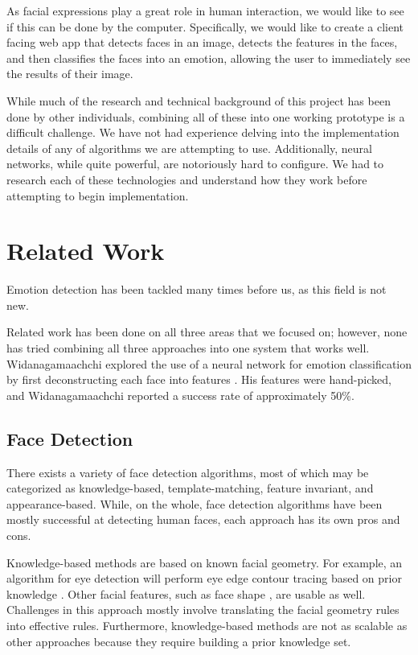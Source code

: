 \documentclass[10pt,twocolumn,letterpaper]{article}
\begin{document}
As facial expressions play a great role in human interaction, we would like to see if this can be done by the computer. Specifically, we would like to create a client facing web app that detects faces in an image, detects the features in the faces, and then classifies the faces into an emotion, allowing the user to immediately see the results of their image.

While much of the research and technical background of this project has been done by other individuals, combining all of these into one working prototype is a difficult challenge. We have not had experience delving into the implementation details of any of algorithms we are attempting to use. Additionally, neural networks, while quite powerful, are notoriously hard to configure. We had to research each of these technologies and understand how they work before attempting to begin implementation.

\section{Related Work}

Emotion detection has been tackled many times before us, as this field is not new. 

Related work has been done on all three areas that we focused on; however, none has tried combining all three approaches into one system that works well. Widanagamaachchi explored the use of a neural network for emotion classification by first deconstructing each face into features \cite{Widanagamaachchi09}. His features were hand-picked, and Widanagamaachchi reported a success rate of approximately 50\%. 

\subsection{Face Detection}

There exists a variety of face detection algorithms, most of which may be categorized as knowledge-based, template-matching, feature invariant, and appearance-based. While, on the whole, face detection algorithms have been mostly successful at detecting human faces, each approach has its own pros and cons.

Knowledge-based methods are based on known facial geometry. For example, an algorithm for eye detection will perform eye edge contour tracing based on prior knowledge \cite{Zhang}. Other facial features, such as face shape \cite{Wang}, are usable as well. Challenges in this approach mostly involve translating the facial geometry rules into effective rules. Furthermore, knowledge-based methods are not as scalable as other approaches because they require building a prior knowledge set.
\end{document}
